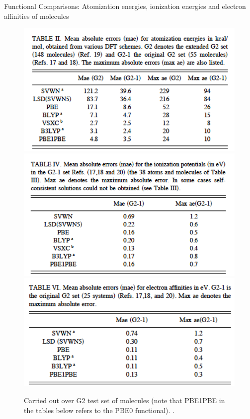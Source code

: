 \documentclass[aspectratio=169]{beamer}
\begin{document}
    \begin{frame}{Functional Comparisons: Atomization energies, ionization energies and electron affinities of molecules}
        \begin{figure}
            \centering
            \includegraphics[width=0.3\linewidth]{lectures/figures/6_atomization_energies.png}
            \includegraphics[width=0.3\linewidth]{lectures/figures/6_IEs.png}
            \includegraphics[width=0.3\linewidth]{lectures/figures/6_EAs.png}
            \caption{Carried out over G2 test set of molecules (note that PBE1PBE in the tables below refers to the PBE0 functional). \cite{ernzerhofAssessmentPerdewBurkeErnzerhofExchangecorrelation1999}.}
        \end{figure}

    \end{frame}
\end{document}
